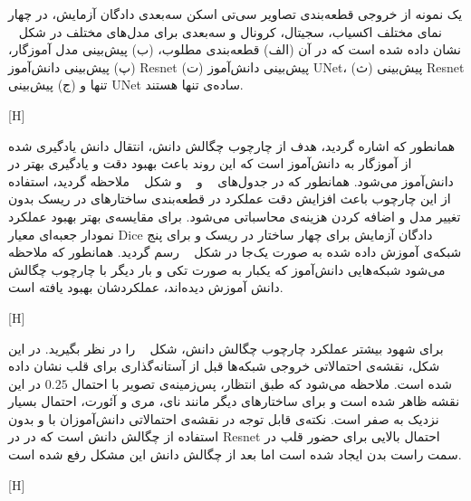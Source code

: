 یک نمونه از خروجی قطعه‌بندی تصاویر سی‌تی اسکن سه‌بعدی دادگان آزمایش، در چهار نمای مختلف اکسیاب، سجیتال، کرونال و سه‌بعدی برای مدل‌های مختلف در شکل ~ نشان داده شده است که در آن (الف) قطعه‌بندی مطلوب، (ب) پیش‌بینی مدل آموزگار، (پ) پیش‌بینی دانش‌آموز Resnet (ت) پیش‌بینی دانش‌آموز UNet، (ث) پیش‌بینی Resnet تنها و (ج) پیش‌بینی UNet ساده‌ی تنها هستند.

[H]


همانطور که اشاره گردید، هدف از چارچوب چگالش دانش، انتقال دانش یادگیری شده از آموزگار به دانش‌آموز است که این‌ روند باعث بهبود دقت و یادگیری بهتر در دانش‌آموز می‌شود. همانطور که در جدول‌های ~ و ~ و شکل ~ ملاحظه‌ گردید، استفاده از این چارچوب باعث افزایش دقت عملکرد در قطعه‌بندی ساختارهای در ریسک بدون تغییر مدل و اضافه کردن هزینه‌ی محاسباتی می‌شود. برای مقایسه‌ی بهتر بهبود عملکرد نمودار جعبه‌ای معیار Dice دادگان آزمایش برای چهار ساختار در ریسک و برای پنج شبکه‌ی آموزش داده شده به صورت یک‌جا در شکل ~ رسم گردید. همانطور که ملاحظه می‌شود شبکه‌هایی دانش‌آموز که یکبار به صورت تکی و بار دیگر با چارچوب چگالش دانش آموزش دیده‌اند، عملکردشان بهبود یافته است.

[H]

برای شهود بیشتر عملکرد چارچوب چگالش دانش، شکل ~ را در نظر بگیرید. در این شکل، نقشه‌ی احتمالاتی خروجی شبکه‌ها قبل از آستانه‌گذاری برای قلب نشان داده شده است. ملاحظه می‌شود که طبق انتظار، پس‌زمینه‌ی تصویر با احتمال $0.25$ در این نقشه ظاهر شده است و برای ساختارهای دیگر مانند نای، مری و آئورت، احتمال بسیار نزدیک به صفر است. نکته‌ی قابل توجه در نقشه‌ی احتمالاتی دانش‌آموزان با و بدون استفاده از چگالش دانش است که در در Resnet احتمال بالایی برای حضور قلب در سمت راست بدن ایجاد شده است اما بعد از چگالش دانش این مشکل رفع شده است.

[H]

